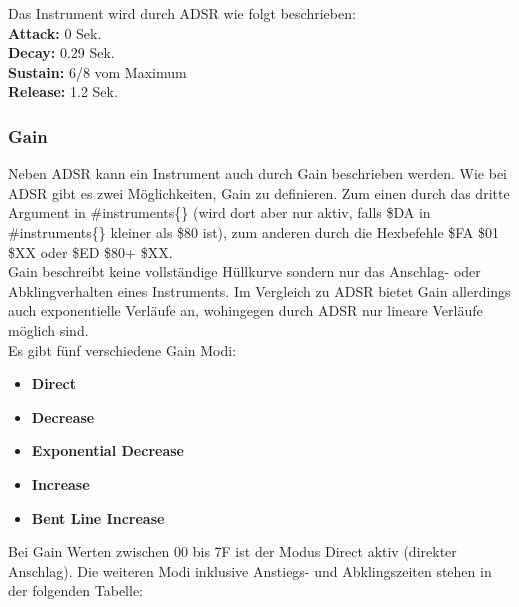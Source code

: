 \bigskip

Das Instrument wird durch ADSR wie folgt beschrieben: \\
\textbf{Attack:} 0 Sek. \\
\textbf{Decay:} 0.29 Sek. \\
\textbf{Sustain:} 6/8 vom Maximum \\
\textbf{Release:} 1.2 Sek.



\subsubsection{Gain}

Neben ADSR kann ein Instrument auch durch Gain beschrieben werden. Wie bei ADSR gibt es zwei Möglichkeiten, Gain zu definieren. Zum einen durch das dritte Argument in \#instruments\{\} (wird dort aber nur aktiv, falls \$DA in \#instruments\{\} kleiner als \$80 ist), zum anderen durch die Hexbefehle \$FA \$01 \$XX oder \$ED \$80+ \$XX. \\
Gain beschreibt keine vollständige Hüllkurve sondern nur das Anschlag- oder Abklingverhalten eines Instruments. Im Vergleich zu ADSR bietet Gain allerdings auch exponentielle Verläufe an, wohingegen durch ADSR nur lineare Verläufe möglich sind. \\
Es gibt fünf verschiedene Gain Modi:

\medskip

\begin{itemize}
	\item \textbf{Direct}
	\item \textbf{Decrease}
	\item \textbf{Exponential Decrease}
	\item \textbf{Increase}
	\item \textbf{Bent Line Increase}
\end{itemize}


\bigskip

Bei Gain Werten zwischen 00 bis 7F ist der Modus Direct aktiv (direkter Anschlag).
Die weiteren Modi inklusive Anstiegs- und Abklingszeiten stehen in der folgenden Tabelle:

\bigskip

